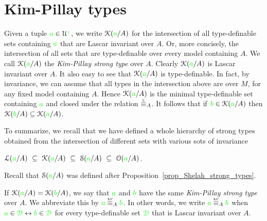 
\section{Kim-Pillay types}\label{KPtypes}

Given a tuple ${\color{green} a}\in\EuScript U^{\color{green} z}$, we write \emph{$\EuScript K({\color{green} a}/A)$\/} for the intersection of all type-definable sets containing ${\color{green} a}$ that are Lascar invariant over $A$.
Or, more concisely, the intersection of all sets that are type-definable over every model containing $A$.
We call $\EuScript K({\color{green} a}/A)$ the \emph{Kim-Pillay strong type\/} over $A$.
Clearly $\EuScript K({\color{green} a}/A)$ is Lascar invariant over $A$.
It also easy to see that $\EuScript K({\color{green} a}/A)$ is type-definable.
In fact, by invariance, we can assume that all types in the intersection above are over $M$, for any fixed model containing $A$.
Hence $\EuScript K({\color{green} a}/A)$ is the minimal type-definable set containing ${\color{green} a}$ and closed under the relation $\equivL_A$.
It follows that if ${\color{green} b}\in\EuScript K({\color{green} a}/A)$ then $\EuScript K({\color{green} b}/A)\subseteq\EuScript K({\color{green} a}/A)$.

To summarize, we recall that we have defined a whole hierarchy of strong types obtained from the intersection of different sets with various sots of invariance

\hfil$\Ll({\gr a}/A)\ \subseteq\ \K({\gr a}/A)\ \subseteq\ \S({\gr a}/A)\ \subseteq\ \O({\gr a}/A)$. 

Recall that $\EuScript S({\color{green} a}/A)$ was defined after Proposition~\ref{prop_Shelah_strong_types}.

If $\EuScript K({\color{green} a}/A)=\EuScript K({\color{green} b}/A)$, we say that ${\color{green} a}$ and ${\color{green} b}$ have the same \emph{Kim-Pillay strong type\/} over $A$.
We abbreviate this by \emph{${\gr a}\stackrel{\smash{\scalebox{.5}{\rm KP}}}{\equiv}_A{\gr b}$.}
In other words, we write ${\gr a}\equivKP_A{\gr b}$ when ${\color{green} a}\in{\color{green}\EuScript D}\leftrightarrow{\color{green}b}\in{\color{green}\EuScript D}$ for every type-definable set ${\color{green}\EuScript D}$ that is Lascar invariant over $A$.


